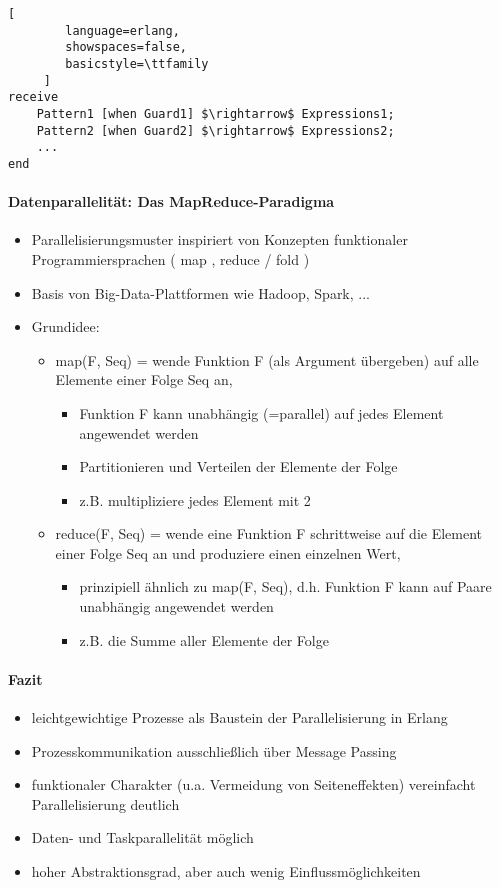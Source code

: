 \documentclass[10pt]{article}
\begin{document}
\begin{lstlisting}[
        language=erlang,
        showspaces=false,
        basicstyle=\ttfamily
     ]
receive
    Pattern1 [when Guard1] $\rightarrow$ Expressions1;
    Pattern2 [when Guard2] $\rightarrow$ Expressions2;
    ...
end
\end{lstlisting}

\paragraph{Datenparallelität: Das MapReduce-Paradigma}
\begin{itemize}
  \item Parallelisierungsmuster inspiriert von Konzepten funktionaler Programmiersprachen ( map , reduce / fold )
  \item Basis von Big-Data-Plattformen wie Hadoop, Spark, ...
  \item Grundidee:
        \begin{itemize}
          \item map(F, Seq) = wende Funktion F (als Argument übergeben) auf alle Elemente einer Folge Seq an,
                \begin{itemize}
                  \item Funktion F kann unabhängig (=parallel) auf jedes Element angewendet werden
                  \item Partitionieren und Verteilen der Elemente der Folge
                  \item z.B. multipliziere jedes Element mit 2
                \end{itemize}
          \item reduce(F, Seq) = wende eine Funktion F schrittweise auf die Element einer Folge Seq an und produziere einen einzelnen Wert,
                \begin{itemize}
                  \item prinzipiell ähnlich zu map(F, Seq), d.h. Funktion F kann auf Paare unabhängig angewendet werden
                  \item z.B. die Summe aller Elemente der Folge
                \end{itemize}
        \end{itemize}
\end{itemize}

\paragraph{Fazit}
\begin{itemize}
  \item leichtgewichtige Prozesse als Baustein der Parallelisierung in Erlang
  \item Prozesskommunikation ausschließlich über Message Passing
  \item funktionaler Charakter (u.a. Vermeidung von Seiteneffekten) vereinfacht Parallelisierung deutlich
  \item Daten- und Taskparallelität möglich
  \item hoher Abstraktionsgrad, aber auch wenig Einflussmöglichkeiten
\end{itemize}
\end{document}

